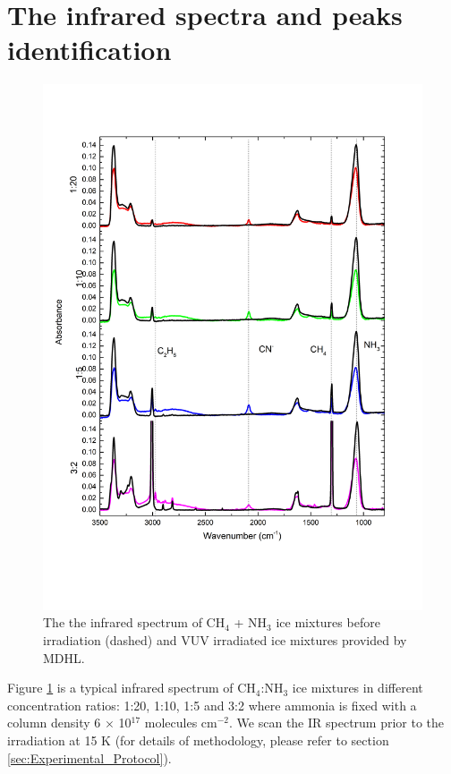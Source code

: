 \section{The infrared spectra and peaks identification}
\begin{figure}
\centering
\includegraphics[width=\textwidth]{figures/chapter3/widerange.png}
\caption{The the infrared spectrum of CH$_4$ + NH$_3$ ice mixtures before irradiation (dashed) and VUV irradiated ice mixtures provided by MDHL. }
\label{fig:widerange}
\end{figure}

Figure \ref{fig:widerange} is a typical infrared spectrum of CH$_4$:NH$_3$ ice mixtures in different concentration ratios: 1:20, 1:10, 1:5 and 3:2 where ammonia is fixed with a column density 6 $\times$ 10$^{17}$ molecules cm$^{-2}$. We scan the IR spectrum prior to the irradiation at 15 K (for details of methodology, please refer to section \ref{sec:Experimental_Protocol}).\\

